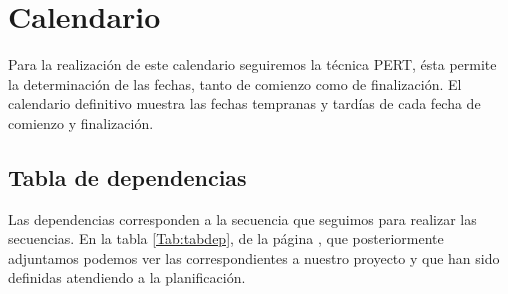 \documentclass[11pt,a4paper,spanish,twoside]{report}
\begin{document}
\chapter{Calendario}
Para la realización de este calendario seguiremos la técnica PERT, ésta
permite la determinación de las fechas, tanto de comienzo como de
finalización. El calendario definitivo muestra las fechas tempranas y tardías
de cada fecha de comienzo y finalización.


\section{Tabla de dependencias}
Las dependencias corresponden a la secuencia que seguimos para realizar las
secuencias. En la tabla \ref{Tab:tabdep}, de la página \pageref{Tab:tabdep},
que posteriormente adjuntamos podemos
ver las correspondientes a nuestro proyecto y que han sido definidas
atendiendo a la planificación.
\end{document}
